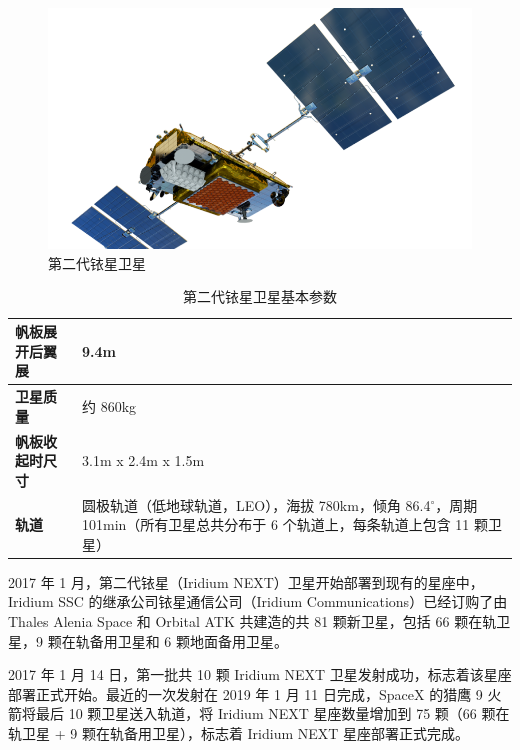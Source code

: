 \begin{itemize}
    \begin{figure}[!htb]
    \centering
    \includegraphics[width=13cm]{pic/IMG_Iridium-Satellite_NEXT-Satellite-Vehicle_HR_FEB16-clip-833x474.png}
    \caption{第二代铱星卫星}
    \label{fig:IMG_Iridium-Satellite_NEXT-Satellite-Vehicle}
    \end{figure}

    \renewcommand\arraystretch{1.5}
    \begin{table}[!htb]
    \centering
    \caption{第二代铱星卫星基本参数}
    \label{tab:iridium_next_paras}
    \begin{tabular}[b]{|p{4cm}<{\raggedleft}|p{8cm}<{\raggedright}|}
    \hline
    \textbf{帆板展开后翼展} & 9.4m \\
    \hline
    \textbf{卫星质量} & 约 860kg\\
    \hline
    \textbf{帆板收起时尺寸}& 3.1m x 2.4m x 1.5m \\
    \hline
    \textbf{轨道} & 圆极轨道（低地球轨道，LEO），海拔 780km，倾角 86.4$^\circ$，周期 101min（所有卫星总共分布于 6 个轨道上，每条轨道上包含 11 颗卫星）\\
    \hline
    \end{tabular}
    \end{table}

    2017 年 1 月，第二代铱星（Iridium NEXT）卫星开始部署到现有的星座中，Iridium SSC 的继承公司铱星通信公司（Iridium Communications）已经订购了由 Thales Alenia Space 和 Orbital ATK 共建造的共 81 颗新卫星，包括 66 颗在轨卫星，9 颗在轨备用卫星和 6 颗地面备用卫星。

    2017 年 1 月 14 日，第一批共 10 颗 Iridium NEXT 卫星发射成功，标志着该星座部署正式开始。最近的一次发射在 2019 年 1 月 11 日完成，SpaceX 的猎鹰 9 火箭将最后 10 颗卫星送入轨道，将 Iridium NEXT 星座数量增加到 75 颗（66 颗在轨卫星 + 9 颗在轨备用卫星），标志着 Iridium NEXT 星座部署正式完成。


\end{itemize}
